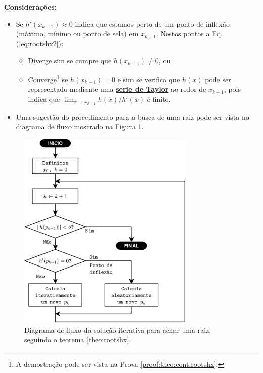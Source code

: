 \begin{theorem}
\textbf{Considerações:}
\begin{itemize} 
\item Se $h'(x_{k-1})\approx 0$ indica que estamos perto de um ponto de inflexão 
(máximo, mínimo ou ponto de sela) em $x_{k-1}$. Nestos pontos a Eq. (\ref{eq:rootshx2}): 
\begin{itemize}
\item Diverge sim se cumpre que $h(x_{k-1})\neq 0$, ou
\item Converge\footnote{A demostração pode ser vista na Prova \ref{proof:theo:cont:rootshx}.} 
se $h(x_{k-1}) = 0$ e sim se verifica que $h(x)$ pode ser representado 
mediante uma \hyperref[def:taylor]{\textbf{serie de Taylor}} ao redor de $x_{k-1}$, 
 pois indica que $\lim_{x\rightarrow x_{k-1}}  h(x)/h'(x)$ é finito.
\end{itemize}
\item Uma sugestão do procedimento para a busca de uma raiz pode ser vista no diagrama de fluxo
mostrado na Figura \ref{fig:fluxorhx1}. 
\end{itemize}
\end{theorem}

\begin{figure}[!h]
     \centering
         \includegraphics[width=0.75\textwidth]{chapters/roots/fluxo1.eps}
        \caption{Diagrama de fluxo da solução iterativa para achar uma raiz, seguindo o teorema \ref{theo:rootshx}.}
        \label{fig:fluxorhx1}
\end{figure}

